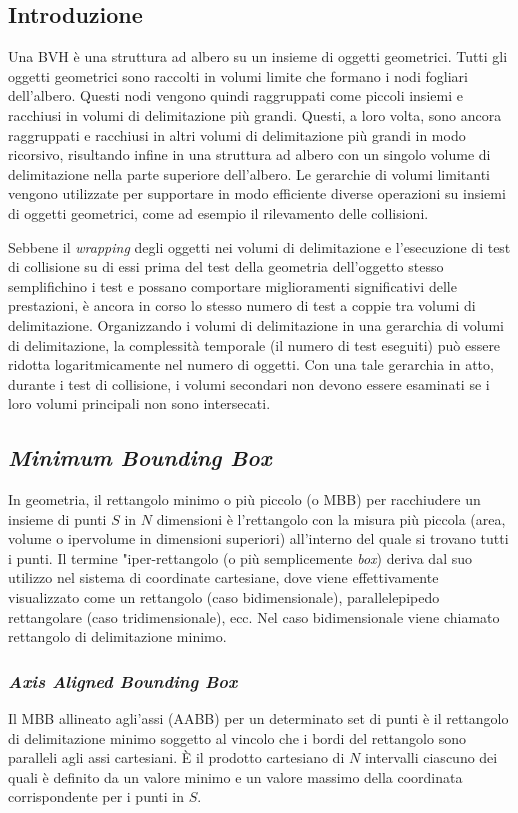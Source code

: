 \subsection{Introduzione}
Una \ac{BVH} è una struttura ad albero su un insieme di oggetti geometrici. Tutti gli oggetti geometrici sono raccolti in volumi limite che formano i nodi fogliari dell'albero. Questi nodi vengono quindi raggruppati come piccoli insiemi e racchiusi in volumi di delimitazione più grandi. Questi, a loro volta, sono ancora raggruppati e racchiusi in altri volumi di delimitazione più grandi in modo ricorsivo, risultando infine in una struttura ad albero con un singolo volume di delimitazione nella parte superiore dell'albero. Le gerarchie di volumi limitanti vengono utilizzate per supportare in modo efficiente diverse operazioni su insiemi di oggetti geometrici, come ad esempio il rilevamento delle collisioni.

Sebbene il \textit{wrapping} degli oggetti nei volumi di delimitazione e l'esecuzione di test di collisione su di essi prima del test della geometria dell'oggetto stesso semplifichino i test e possano comportare miglioramenti significativi delle prestazioni, è ancora in corso lo stesso numero di test a coppie tra volumi di delimitazione. Organizzando i volumi di delimitazione in una gerarchia di volumi di delimitazione, la complessità temporale (il numero di test eseguiti) può essere ridotta logaritmicamente nel numero di oggetti. Con una tale gerarchia in atto, durante i test di collisione, i volumi secondari non devono essere esaminati se i loro volumi principali non sono intersecati.
%
\subsection{\textit{Minimum Bounding Box}}
In geometria, il rettangolo minimo o più piccolo (o \ac{MBB}) per racchiudere un insieme di punti $S$ in $N$ dimensioni è l'rettangolo con la misura più piccola (area, volume o ipervolume in dimensioni superiori) all'interno del quale si trovano tutti i punti.  Il termine "iper-rettangolo (o più semplicemente \textit{box}) deriva dal suo utilizzo nel sistema di coordinate cartesiane, dove viene effettivamente visualizzato come un rettangolo (caso bidimensionale), parallelepipedo rettangolare (caso tridimensionale), ecc. Nel caso bidimensionale viene chiamato rettangolo di delimitazione minimo.
%
\subsubsection{\textit{Axis Aligned Bounding Box}}
Il \ac{MBB} allineato agli'assi (\ac{AABB}) per un determinato set di punti è il rettangolo di delimitazione minimo soggetto al vincolo che i bordi del rettangolo sono paralleli agli assi cartesiani. È il prodotto cartesiano di $N$ intervalli ciascuno dei quali è definito da un valore minimo e un valore massimo della coordinata corrispondente per i punti in $S$.

